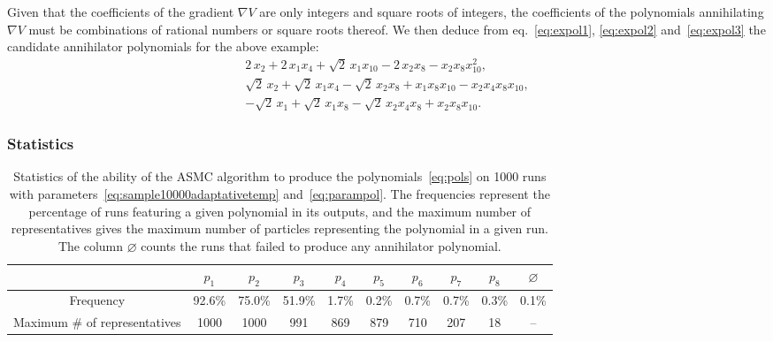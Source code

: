 \documentclass[11pt,a4paper]{article}
\begin{document}
	Given that the coefficients of the gradient $\nabla V$ are only integers and square roots of integers, the coefficients of the polynomials annihilating $\nabla V$ must be combinations of rational numbers or square roots thereof. We then deduce from eq.~\eqref{eq:expol1}, \eqref{eq:expol2} and~\eqref{eq:expol3} the candidate annihilator polynomials for the above example:
	\begin{equation}
		\begin{gathered}
			2\,x_{2} + 2\,x_{1}x_{4} + \sqrt{2}\,x_{1}x_{10} - 2\,x_{2}x_{8} - x_{2}x_{8}x_{10}^{2},\\[5pt]
	      \sqrt{2}\,x_{2} + \sqrt{2}\,x_{1}x_{4} - \sqrt{2}\,x_{2}x_{8} + x_{1}x_{8}x_{10} - x_{2}x_{4}x_{8}x_{10}, \\[5pt]
	      -\sqrt{2}\,x_{1} + \sqrt{2}\,x_{1}x_{8} - \sqrt{2}\,x_{2}x_{4}x_{8} + x_{2}x_{8}x_{10}.
		\end{gathered}
	\end{equation}

	\subsubsection{Statistics}

	\begin{table}[b!]
		\centering
		\renewcommand{\arraystretch}{1.3}
		\begin{tabular}{c|ccccccccc}
			& $p_{1}$ & $p_{2}$ & $p_{3}$ & $p_{4}$ & $p_{5}$ & $p_{6}$ & $p_{7}$  & $p_{8}$&  $\varnothing$  \\\hline\hline
			Frequency & 92.6\% & 75.0\% & 51.9\% & 1.7\% & 0.2\% & 0.7\% & 0.7\% & 0.3\% & 0.1\% \\
			Maximum \# of representatives & 1000 & 1000 & 991 & 869 & 879 & 710 & 207 & 18 & --
		\end{tabular}
		\caption{Statistics of the ability of the ASMC algorithm to produce the polynomials~\eqref{eq:pols} on 1000 runs with parameters~\eqref{eq:sample10000adaptativetemp} and~\eqref{eq:parampol}. The frequencies represent the percentage of runs featuring a given polynomial in its outputs, and the maximum number of representatives gives the maximum number of particles representing the polynomial in a given run. The column $\varnothing$ counts the runs that failed to produce any annihilator polynomial.}
		\label{table:results}
	\end{table}
\end{document}
